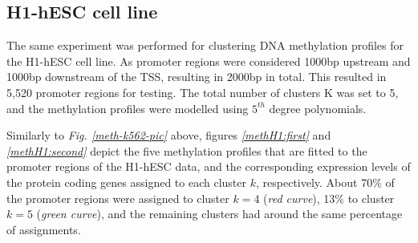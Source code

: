 \subsection{H1-hESC cell line} \label{meth-encode-h1-subsect}
The same experiment was performed for clustering DNA methylation profiles for the H1-hESC cell line. As promoter regions were considered 1000bp upstream and 1000bp downstream of the TSS, resulting in 2000bp in total. This resulted in 5,520 promoter regions for testing. The total number of clusters K was set to 5, and the methylation profiles were modelled using $5^{th}$ degree polynomials. 

Similarly to \emph{Fig. \ref{meth-k562-pic}} above, figures \emph{\ref{methH1:first}} and \emph{\ref{methH1:second}} depict the five methylation profiles that are fitted to the promoter regions of the H1-hESC data, and the corresponding expression levels of the protein coding genes assigned to each cluster $k$, respectively. About 70\% of the promoter regions were assigned to cluster $k=4$ (\emph{red curve}), 13\% to cluster $k=5$ (\emph{green curve}), and the remaining clusters had around the same percentage of assignments. 

